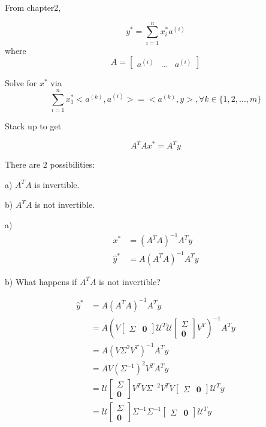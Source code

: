 From chapter2, 

\begin{equation*}
y^* = \sum^n_{i=1}x_i^*a^{(i)}
\end{equation*}
where 
$$ A =   
\left[
\begin{matrix}
a^{(i)} & ... & a^{(i)}
\end{matrix}
\right]
$$

Solve for $x^*$ via
\begin{equation*}
\sum^n_{i=1}x_1^*<a^{(k)}, a^{(i)}> = <a^{(k)}, y>, \forall k \in \{1,2,...,m \}
\end{equation*}

Stack up to get 

\begin{equation*}
A^TAx^* = A^Ty
\end{equation*}

There are 2 possibilities:

a) $A^TA$ is invertible.

b) $A^TA$ is not invertible.

a) 
\begin{align*}
x^* &= (A^TA)^{-1}A^Ty\\
\hat{y}^* &= A(A^TA)^{-1}A^Ty
\end{align*}

b) What happens if $A^TA$ is not invertible? 

\begin{align*}
\hat{y}^* &= A(A^TA)^{-1}A^Ty\\
&= A(V
\begin{bmatrix}
\Sigma & \textbf{0}
\end{bmatrix}
\mathcal{U}^T\mathcal{U}
\begin{bmatrix}
\Sigma \\
\textbf{0}
\end{bmatrix}
V^T)^{-1}A^Ty\\
&= A(V\Sigma^2V^T)^{-1}A^Ty\\
&= AV(\Sigma^{-1})^2V^TA^Ty\\
&= \mathcal{U}
\begin{bmatrix}
\Sigma \\
\textbf{0}
\end{bmatrix}
V^TV\Sigma^{-2}V^TV
\begin{bmatrix}
\Sigma & \textbf{0}
\end{bmatrix}
\mathcal{U}^Ty\\
&= \mathcal{U}
\begin{bmatrix}
\Sigma \\
\textbf{0}
\end{bmatrix}
\Sigma^{-1}\Sigma^{-1}
\begin{bmatrix}
\Sigma & \textbf{0}
\end{bmatrix}
\mathcal{U}^Ty
\end{align*}

